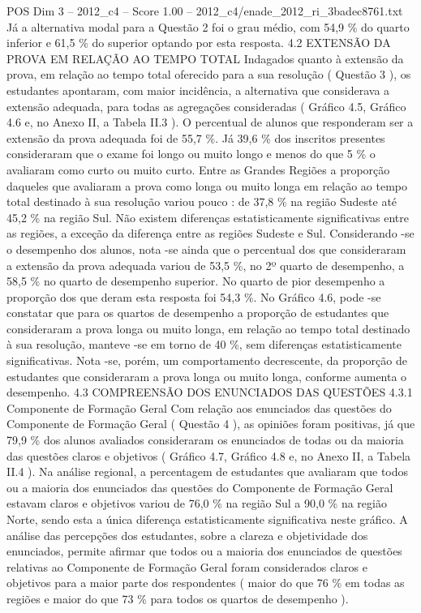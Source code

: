 \begin{textsample}{POS Dim 3 – 2012\_c4 – Score 1.00 – 2012\_c4/enade\_2012\_ri\_3badec8761.txt}
Já a alternativa modal para a Questão 2 foi o grau médio, com 54,9 \% do quarto inferior e 61,5 \% do superior optando por esta resposta. 4.2 EXTENSÃO DA PROVA EM RELAÇÃO AO TEMPO TOTAL Indagados quanto à extensão da prova, em relação ao tempo total oferecido para a sua resolução ( Questão 3 ), os estudantes apontaram, com maior incidência, a alternativa que considerava a extensão adequada, para todas as agregações consideradas ( Gráfico 4.5, Gráfico 4.6 e, no Anexo II, a Tabela II.3 ).
O percentual de alunos que responderam ser a extensão da prova adequada foi de 55,7 \%.
Já 39,6 \% dos inscritos presentes consideraram que o exame foi longo ou muito longo e menos do que 5 \% o avaliaram como curto ou muito curto.
Entre as Grandes Regiões a proporção daqueles que avaliaram a prova como longa ou muito longa em relação ao tempo total destinado à sua resolução variou pouco : de 37,8 \% na região Sudeste até 45,2 \% na região Sul.
Não existem diferenças estatisticamente significativas entre as regiões, a exceção da diferença entre as regiões Sudeste e Sul.
Considerando -se o desempenho dos alunos, nota -se ainda que o percentual dos que consideraram a extensão da prova adequada variou de 53,5 \%, no 2º quarto de desempenho, a 58,5 \% no quarto de desempenho superior.
No quarto de pior desempenho a proporção dos que deram esta resposta foi 54,3 \%.
No Gráfico 4.6, pode -se constatar que para os quartos de desempenho a proporção de estudantes que consideraram a prova longa ou muito longa, em relação ao tempo total destinado à sua resolução, manteve -se em torno de 40 \%, sem diferenças estatisticamente significativas.
Nota -se, porém, um comportamento decrescente, da proporção de estudantes que consideraram a prova longa ou muito longa, conforme aumenta o desempenho. 4.3 COMPREENSÃO DOS ENUNCIADOS DAS QUESTÕES 4.3.1 Componente de Formação Geral Com relação aos enunciados das questões do Componente de Formação Geral ( Questão 4 ), as opiniões foram positivas, já que 79,9 \% dos alunos avaliados consideraram os enunciados de todas ou da maioria das questões claros e objetivos ( Gráfico 4.7, Gráfico 4.8 e, no Anexo II, a Tabela II.4 ).
Na análise regional, a percentagem de estudantes que avaliaram que todos ou a maioria dos enunciados das questões do Componente de Formação Geral estavam claros e objetivos variou de 76,0 \% na região Sul a 90,0 \% na região Norte, sendo esta a única diferença estatisticamente significativa neste gráfico.
A análise das percepções dos estudantes, sobre a clareza e objetividade dos enunciados, permite afirmar que todos ou a maioria dos enunciados de questões relativas ao Componente de Formação Geral foram considerados claros e objetivos para a maior parte dos respondentes ( maior do que 76 \% em todas as regiões e maior do que 73 \% para todos os quartos de desempenho ).

\end{textsample}
